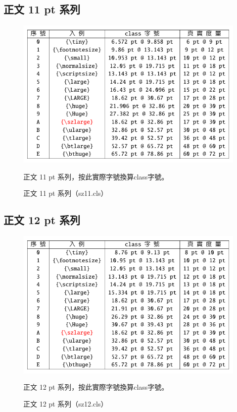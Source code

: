 \subsection{正文 11 pt 系列}
\begin{figure}[H]
\begin{center}
\caption{正文 11 pt 系列（sz11.cls）}
{ \includegraphics[scale=1]{figures/sz11.pdf}}
\end{center}
\par 正文 11 pt 系列，按此實際字號換算class字號。
\end{figure}


\subsection{正文 12 pt 系列}
\begin{figure}[H]
\begin{center}
\caption{正文 12 pt 系列（sz12.cls）}
{ \includegraphics[scale=1]{figures/sz12.pdf}}
\end{center}
\par 正文 12 pt 系列，按此實際字號換算class字號。
\end{figure}

